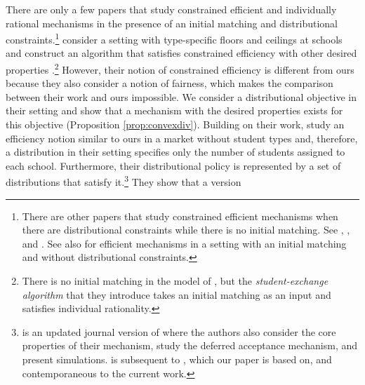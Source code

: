 \documentclass[12pt]{amsart}
\theoremstyle{remark}
\newcommand{\ieh}[1]{{\color{orange} IEH: #1 }}
\newcommand{\fk}[1]{{\color{red} FK: #1 }}
\begin{document}
There are only a few papers that study constrained efficient and individually rational mechanisms in the presence of an initial matching and distributional constraints.\footnote{There are other papers that study constrained efficient mechanisms when there are distributional constraints while there is no initial matching. See \cite{abdulson03}, \cite{imamuraefficient}, and \cite{koji2022}. See also \cite{abdulkadirouglu1999house} for efficient mechanisms in a setting with an initial matching and without distributional constraints.} %
\cite{ehayeyi14} consider a setting with type-specific floors and ceilings at schools and construct an algorithm that satisfies constrained efficiency
with other desired properties \citep[Theorem 2]{ehayeyi14}.\footnote{There is no initial matching in the model of \cite{ehayeyi14}, but the
\emph{student-exchange algorithm} that they introduce takes an initial matching as an input and satisfies individual rationality.}
However, their notion of constrained efficiency is different from ours because they also consider a notion of fairness, which makes the comparison
between their work and ours impossible. We consider a distributional objective in their setting and show that a mechanism with the
desired properties exists for this objective (Proposition \ref{prop:convexdiv}). Building on their work,
\citet{suzuki17} study an efficiency notion similar to ours in a market without student types and, therefore, a distribution in their setting specifies only the number of students assigned to each school. Furthermore, their distributional policy is represented by a set of distributions that satisfy it.\footnote{\cite{suzuki2023strategyproof} is an updated journal version of
\citet{suzuki17} where the authors also consider the core
properties of their mechanism, study the deferred acceptance mechanism, and present simulations. \cite{suzuki2023strategyproof}
is subsequent to \cite{interdistrictwp}, which our paper is based on, and contemporaneous to the current work.} They show that a version
\end{document}
